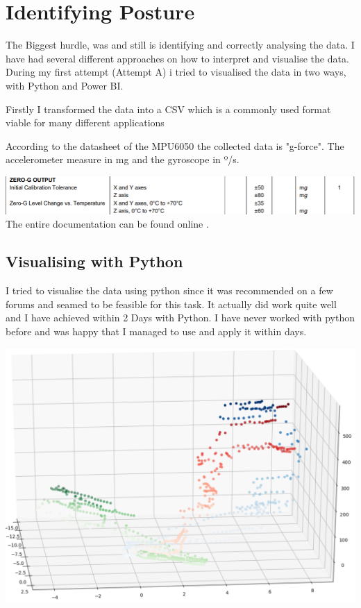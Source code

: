 \section{Identifying Posture}

The Biggest hurdle, was and still is identifying and correctly analysing the data. I have had several different approaches on how to interpret and visualise the data. During my first attempt (Attempt A) i tried to visualised the data in two ways, with Python and Power BI.

Firstly I transformed the data into a CSV which is a commonly used format viable for many different applications

According to the datasheet of the MPU6050 the collected data is "g-force". The accelerometer measure in mg and the gyroscope in º/s. 

\includegraphics[width=\linewidth]{images/MPU6050_DATA.png}
The entire documentation can be found online \cite{MPU6000D59:online}.

\subsection{Visualising with Python}

I tried to visualise the data using python since it was recommended on a few forums and seamed to be feasible for this task. It actually did work quite well and I have achieved within 2 Days with Python. I have never worked with python before and was happy that I managed to use and apply it within days. 

\includegraphics[width=\linewidth]{images/PyVisualisation.png}

